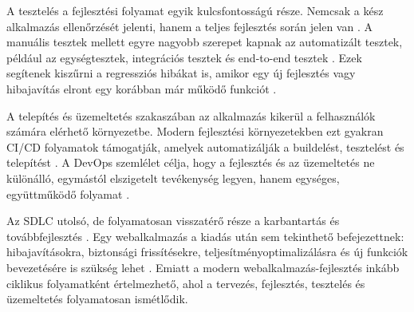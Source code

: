 A tesztelés a fejlesztési folyamat egyik kulcsfontosságú része. Nemcsak a kész alkalmazás ellenőrzését jelenti, hanem a teljes fejlesztés során jelen van \cite{ibmShiftLeftTesting}. A manuális tesztek mellett egyre nagyobb szerepet kapnak az automatizált tesztek, például az egységtesztek, integrációs tesztek és end-to-end tesztek \cite{mdnAutomatedTesting}. Ezek segítenek kiszűrni a regressziós hibákat is, amikor egy új fejlesztés vagy hibajavítás elront egy korábban már működő funkciót \cite{istqbGlossaryRegressionTesting}.

A telepítés és üzemeltetés szakaszában az alkalmazás kikerül a felhasználók számára elérhető környezetbe. Modern fejlesztési környezetekben ezt gyakran CI/CD folyamatok támogatják, amelyek automatizálják a buildelést, tesztelést és telepítést \cite{awsCicd}. A DevOps szemlélet célja, hogy a fejlesztés és az üzemeltetés ne különálló, egymástól elszigetelt tevékenység legyen, hanem egységes, együttműködő folyamat \cite{atlassianDevOps}.

Az SDLC utolsó, de folyamatosan visszatérő része a karbantartás és továbbfejlesztés \cite{isoIecIeee14764Maintenance}. Egy webalkalmazás a kiadás után sem tekinthető befejezettnek: hibajavításokra, biztonsági frissítésekre, teljesítményoptimalizálásra és új funkciók bevezetésére is szükség lehet \cite{nistSp800218Ssdf}. Emiatt a modern webalkalmazás-fejlesztés inkább ciklikus folyamatként értelmezhető, ahol a tervezés, fejlesztés, tesztelés és üzemeltetés folyamatosan ismétlődik.
